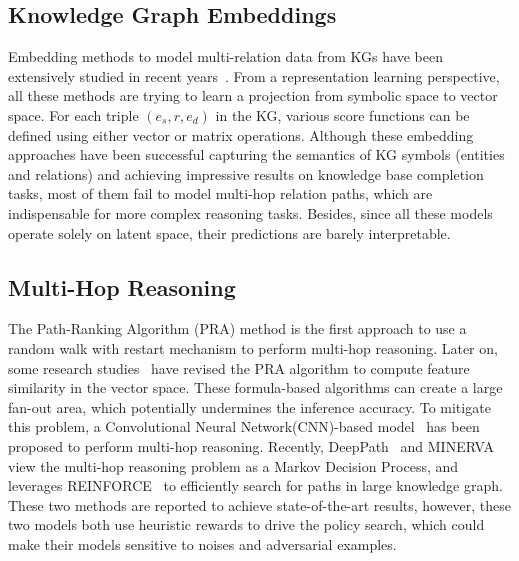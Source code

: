 \documentclass[11pt,a4paper]{article}
\begin{document}
\subsection{Knowledge Graph Embeddings}
Embedding methods to model multi-relation data from KGs have been extensively studied in recent years~\cite{nickel2011three,bordes2013translating,socher2013reasoning,lin2015learning,trouillon2017knowledge}. From a representation learning perspective, all these methods are trying to learn a projection from symbolic space to vector space. For each triple $(e_s, r, e_d)$ in the KG, various score functions can be defined using either vector or matrix operations. Although these embedding approaches have been successful capturing the semantics of KG symbols (entities and relations) and achieving impressive results on knowledge base completion tasks, most of them fail to model multi-hop relation paths, which are indispensable for more complex reasoning tasks. Besides, since all these models operate solely on latent space, their predictions are barely interpretable.

\subsection{Multi-Hop Reasoning}
The Path-Ranking Algorithm (PRA) method is the first approach to use a random walk with restart mechanism to perform multi-hop reasoning. Later on, some research studies~\cite{gardner2014incorporating,gardner2013improving} have revised the PRA algorithm to compute feature similarity in the vector space. These formula-based algorithms can create a large fan-out area, which potentially undermines the inference accuracy. To mitigate this problem, a Convolutional Neural Network(CNN)-based model~\cite{toutanova2015representing} has been proposed to perform multi-hop reasoning. Recently, DeepPath~\cite{xiong2017deeppath} and MINERVA~\cite{das2017go} view the multi-hop reasoning problem as a Markov Decision Process, and leverages REINFORCE~\cite{williams1992simple} to efficiently search for paths in large knowledge graph. These two methods are reported to achieve state-of-the-art results, however, these two models both use heuristic rewards to drive the policy search, which could make their models sensitive to noises and adversarial examples. 
\end{document}
